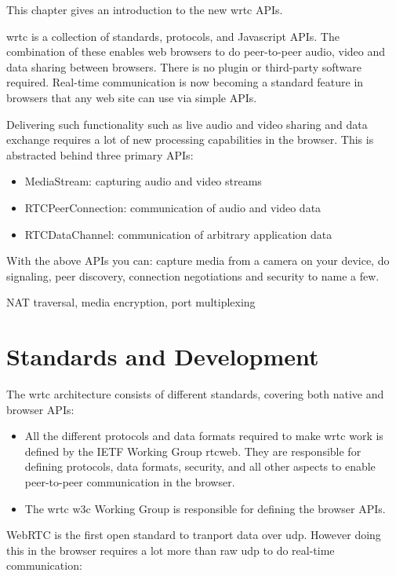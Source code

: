 
This chapter gives an introduction to the new \gls{wrtc} APIs.

\gls{wrtc} is a collection of standards, protocols, and Javascript APIs. The combination of these enables web browsers to do peer-to-peer audio, video and data sharing between browsers. There is no plugin or third-party software required. Real-time communication is now becoming a standard feature in browsers that any web site can use via simple APIs.

Delivering such functionality such as live audio and video sharing and data exchange requires a lot of new processing capabilities in the browser. This is abstracted behind three primary APIs:

\begin{itemize}
\item MediaStream: capturing audio and video streams
\item RTCPeerConnection: communication of audio and video data
\item RTCDataChannel: communication of arbitrary application data
\end{itemize}

With the above APIs you can: capture media from a camera on your device, do signaling, peer discovery, connection negotiations and security to name a few.

NAT traversal, media encryption, port multiplexing

\section{Standards and Development}
The \gls{wrtc} architecture consists of different standards, covering both native and browser APIs:

\begin{itemize}
\item All the different protocols and data formats required to make \gls{wrtc} work is defined by the IETF Working Group \gls{rtcweb}. They are responsible for defining protocols, data formats, security, and all other aspects to enable peer-to-peer communication in the browser.
\item The \gls{wrtc} \gls{w3c} Working Group is responsible for defining the browser APIs.
\end{itemize}

WebRTC is the first open standard to tranport data over \gls{udp}. However doing this in the browser requires a lot more than raw \gls{udp} to do real-time communication:



